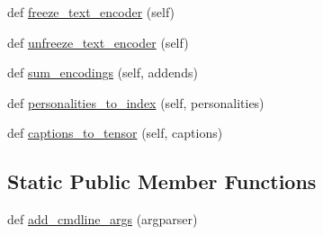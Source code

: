 \begin{DoxyCompactItemize}
\item 
def \hyperlink{classtransresnet_1_1modules_1_1TransresnetModel_aaa175ffaf6daa6348a2c5479f38be530}{freeze\+\_\+text\+\_\+encoder} (self)
\item 
def \hyperlink{classtransresnet_1_1modules_1_1TransresnetModel_af09f30a28796ae02eaa8b6cf39bcf2d1}{unfreeze\+\_\+text\+\_\+encoder} (self)
\item 
def \hyperlink{classtransresnet_1_1modules_1_1TransresnetModel_ad510db9128829888d74b02e520cad7b9}{sum\+\_\+encodings} (self, addends)
\item 
def \hyperlink{classtransresnet_1_1modules_1_1TransresnetModel_a850b8d781e749d3242788dc8e344b8fe}{personalities\+\_\+to\+\_\+index} (self, personalities)
\item 
def \hyperlink{classtransresnet_1_1modules_1_1TransresnetModel_a6d8ed65c210d4ab0a665ba305257c3d6}{captions\+\_\+to\+\_\+tensor} (self, captions)
\end{DoxyCompactItemize}
\subsection*{Static Public Member Functions}
\begin{DoxyCompactItemize}
\item 
def \hyperlink{classtransresnet_1_1modules_1_1TransresnetModel_a37a730369e722d8b9bad531b3cf7e8a3}{add\+\_\+cmdline\+\_\+args} (argparser)
\end{DoxyCompactItemize}

